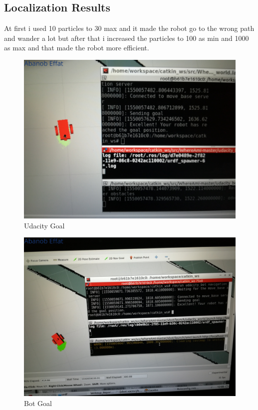 \documentclass[10pt,journal,compsoc]{IEEEtran}
\begin{document}
\subsection{Localization Results}
At first i used 10 particles to 30 max and it made the robot go to the wrong path and wander a lot but after that i increased the particles to 100 as min and 1000 as max and that made the robot more efficient. 
\begin{figure}[thpb]
      \centering
      \includegraphics[width=\linewidth]{fig/fin_ubot.jpg}
      \caption{Udacity Goal}
\end{figure}
\begin{figure}[thpb]
      \centering
      \includegraphics[width=\linewidth]{fig/fin_u.jpg}
      \caption{Bot Goal}
\end{figure}
\end{document}
